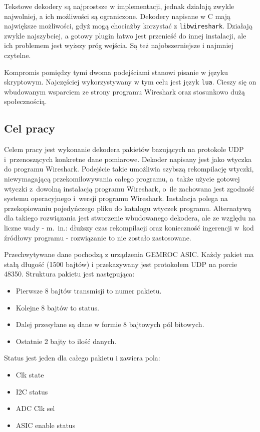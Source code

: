 \documentclass[a4paper, 12pt, twoside, openright]{article}
\begin{document}
	Tekstowe dekodery są najprostsze w implementacji, jednak działają zwykle najwolniej, a ich możliwości są ograniczone.
	Dekodery napisane w C mają największe możliwości, gdyż mogą chociażby korzystać z \texttt{libwireshark}. Działają zwykle
	najszybciej, a gotowy plugin łatwo jest przenieść do innej instalacji, ale ich problemem jest wyższy próg wejścia. 
	Są też najobszerniejsze i najmniej czytelne.

	Kompromis pomiędzy tymi dwoma podejściami stanowi pisanie w języku skryptowym. Najczęściej wykorzystywany w tym celu jest
	język \texttt{lua}. Cieszy się on wbudowanym wsparciem ze strony programu Wireshark oraz stosunkowo dużą społecznością.



	\newpage
\subsection{Cel pracy}

	\indent\par
	Celem pracy jest wykonanie dekodera pakietów bazujących na protokole UDP i~przenoszących konkretne dane pomiarowe.
	Dekoder napisany jest jako wtyczka do programu Wireshark. Podejście takie umożliwia szybszą rekompilację wtyczki,
	niewymagającą przekomilowywania całego programu, a~także użycie gotowej wtyczki z~dowolną instalacją programu Wireshark,
	o~ile zachowana jest zgodność systemu operacyjnego i~wersji programu Wireshark. Instalacja polega na przekopiowaniu
	pojedyńczego pliku do katalogu wtyczek programu. Alternatywą dla takiego rozwiązania jest stworzenie wbudowanego dekodera,
	ale ze względu na liczne wady - m.~in.: dłuższy czas rekompilacji oraz konieczność ingerencji w~kod źródłowy programu - rozwiązanie
	to nie zostało zastosowane.

	Przechwytywane dane pochodzą z urządzenia GEMROC ASIC. Każdy pakiet ma stałą długość (1500 bajtów) i przekazywany jest 
	protokołem UDP na porcie 48350. Struktura pakietu jest następująca:
	\begin{itemize}
		\item Pierwsze 8 bajtów transmisji to numer pakietu.
		\item Kolejne 8 bajtów to status.
		\item Dalej przesyłane są dane w formie 8 bajtowych pól bitowych.
		\item Ostatnie 2 bajty to ilość danych.
	\end{itemize}

	Status jest jeden dla całego pakietu i zawiera pola:
	\begin{itemize}
		\item Clk state
		\item I2C status
		\item ADC Clk sel
		\item ASIC enable status
	\end{itemize}
\end{document}
